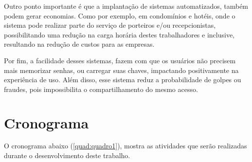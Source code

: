 Outro ponto importante é que a implantação de sistemas automatizados, também 
podem gerar economias. Como por exemplo, em condomínios e hotéis, onde o 
sistema pode realizar parte do serviço de porteiros e/ou recepcionistas, 
possibilitando uma redução na carga horária destes trabalhadores e 
inclusive, resultando na redução de custos para as empresas.

Por fim, a facilidade desses sistemas, fazem com que os usuários não precisem 
mais memorizar senhas, ou carregar suas chaves, impactando positivamente na 
experiência de uso. Além disso, esse sistema reduz a probabilidade de golpes 
ou fraudes, pois impossibilita o compartilhamento do mesmo acesso.

\section{Cronograma}\label{sec:cronograma}

O cronograma abaixo (\autoref{quad:quadro1}), mostra as atividades que 
serão realizadas durante o desenvolvimento deste trabalho.

